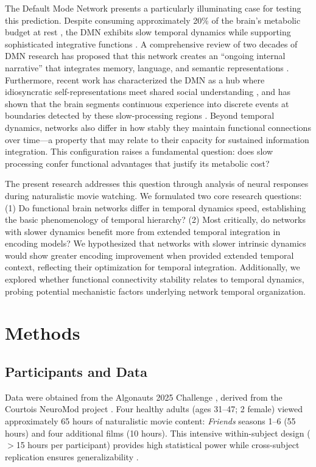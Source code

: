 \documentclass[10pt,letterpaper]{article}
\begin{document}
The Default Mode Network presents a particularly illuminating case for testing this prediction. Despite consuming approximately 20\% of the brain's metabolic budget at rest \citep{raichle2006brain}, the DMN exhibits slow temporal dynamics while supporting sophisticated integrative functions \citep{andrews2014default, buckner2008brain, spreng2009common}. A comprehensive review of two decades of DMN research has proposed that this network creates an ``ongoing internal narrative'' that integrates memory, language, and semantic representations \citep{menon2023dmn}. Furthermore, recent work has characterized the DMN as a hub where idiosyncratic self-representations meet shared social understanding \citep{yeshurun2021default}, and has shown that the brain segments continuous experience into discrete events at boundaries detected by these slow-processing regions \citep{baldassano2017discovering}. Beyond temporal dynamics, networks also differ in how stably they maintain functional connections over time---a property that may relate to their capacity for sustained information integration. This configuration raises a fundamental question: does slow processing confer functional advantages that justify its metabolic cost?

The present research addresses this question through analysis of neural responses during naturalistic movie watching. We formulated two core research questions: (1) Do functional brain networks differ in temporal dynamics speed, establishing the basic phenomenology of temporal hierarchy? (2) Most critically, do networks with slower dynamics benefit more from extended temporal integration in encoding models? We hypothesized that networks with slower intrinsic dynamics would show greater encoding improvement when provided extended temporal context, reflecting their optimization for temporal integration. Additionally, we explored whether functional connectivity stability relates to temporal dynamics, probing potential mechanistic factors underlying network temporal organization.

\section{Methods}

\subsection{Participants and Data}

Data were obtained from the Algonauts 2025 Challenge \citep{gifford2024algonauts}, derived from the Courtois NeuroMod project \citep{boyle2020courtois}. Four healthy adults (ages 31--47; 2 female) viewed approximately 65 hours of naturalistic movie content: \textit{Friends} seasons 1--6 (55 hours) and four additional films (10 hours). This intensive within-subject design ($>$15 hours per participant) provides high statistical power while cross-subject replication ensures generalizability \citep{hasson2010reliability}.
\end{document}
